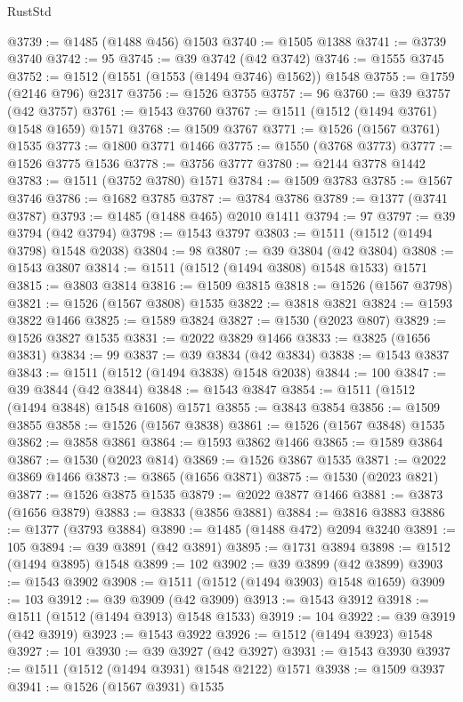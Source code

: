 \begin{lexlean}{RustStd}
\begin{coremodule}
{\begin{coremodule}
{{{{{{{{{{{{{{{{{{{{{{{{{{{{{{{{{{{@3739 := @1485 (@1488 @456) @1503
@3740 := @1505 @1388
@3741 := @3739 @3740
@3742 := 95
@3745 := @39 @3742 (@42 @3742)
@3746 := @1555 @3745
@3752 := @1512 (@1551 (@1553 (@1494 @3746) @1562)) @1548
@3755 := @1759 (@2146 @796) @2317
@3756 := @1526 @3755
@3757 := 96
@3760 := @39 @3757 (@42 @3757)
@3761 := @1543 @3760
@3767 := @1511 (@1512 (@1494 @3761) @1548 @1659) @1571
@3768 := @1509 @3767
@3771 := @1526 (@1567 @3761) @1535
@3773 := @1800 @3771 @1466
@3775 := @1550 (@3768 @3773)
@3777 := @1526 @3775 @1536
@3778 := @3756 @3777
@3780 := @2144 @3778 @1442
@3783 := @1511 (@3752 @3780) @1571
@3784 := @1509 @3783
@3785 := @1567 @3746
@3786 := @1682 @3785
@3787 := @3784 @3786
@3789 := @1377 (@3741 @3787)
@3793 := @1485 (@1488 @465) @2010 @1411
@3794 := 97
@3797 := @39 @3794 (@42 @3794)
@3798 := @1543 @3797
@3803 := @1511 (@1512 (@1494 @3798) @1548 @2038)
@3804 := 98
@3807 := @39 @3804 (@42 @3804)
@3808 := @1543 @3807
@3814 := @1511 (@1512 (@1494 @3808) @1548 @1533) @1571
@3815 := @3803 @3814
@3816 := @1509 @3815
@3818 := @1526 (@1567 @3798)
@3821 := @1526 (@1567 @3808) @1535
@3822 := @3818 @3821
@3824 := @1593 @3822 @1466
@3825 := @1589 @3824
@3827 := @1530 (@2023 @807)
@3829 := @1526 @3827 @1535
@3831 := @2022 @3829 @1466
@3833 := @3825 (@1656 @3831)
@3834 := 99
@3837 := @39 @3834 (@42 @3834)
@3838 := @1543 @3837
@3843 := @1511 (@1512 (@1494 @3838) @1548 @2038)
@3844 := 100
@3847 := @39 @3844 (@42 @3844)
@3848 := @1543 @3847
@3854 := @1511 (@1512 (@1494 @3848) @1548 @1608) @1571
@3855 := @3843 @3854
@3856 := @1509 @3855
@3858 := @1526 (@1567 @3838)
@3861 := @1526 (@1567 @3848) @1535
@3862 := @3858 @3861
@3864 := @1593 @3862 @1466
@3865 := @1589 @3864
@3867 := @1530 (@2023 @814)
@3869 := @1526 @3867 @1535
@3871 := @2022 @3869 @1466
@3873 := @3865 (@1656 @3871)
@3875 := @1530 (@2023 @821)
@3877 := @1526 @3875 @1535
@3879 := @2022 @3877 @1466
@3881 := @3873 (@1656 @3879)
@3883 := @3833 (@3856 @3881)
@3884 := @3816 @3883
@3886 := @1377 (@3793 @3884)
@3890 := @1485 (@1488 @472) @2094 @3240
@3891 := 105
@3894 := @39 @3891 (@42 @3891)
@3895 := @1731 @3894
@3898 := @1512 (@1494 @3895) @1548
@3899 := 102
@3902 := @39 @3899 (@42 @3899)
@3903 := @1543 @3902
@3908 := @1511 (@1512 (@1494 @3903) @1548 @1659)
@3909 := 103
@3912 := @39 @3909 (@42 @3909)
@3913 := @1543 @3912
@3918 := @1511 (@1512 (@1494 @3913) @1548 @1533)
@3919 := 104
@3922 := @39 @3919 (@42 @3919)
@3923 := @1543 @3922
@3926 := @1512 (@1494 @3923) @1548
@3927 := 101
@3930 := @39 @3927 (@42 @3927)
@3931 := @1543 @3930
@3937 := @1511 (@1512 (@1494 @3931) @1548 @2122) @1571
@3938 := @1509 @3937
@3941 := @1526 (@1567 @3931) @1535
}}}}}}}}}}}}}}}}}}}}}}}}}}}}}}}}}}}
\end{coremodule}}
\end{coremodule}
\end{lexlean}
